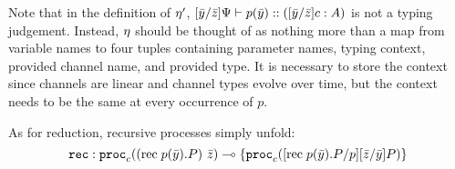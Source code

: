 \documentclass[a4paper,USenglish]{lipics-v2016}
\begin{document}

Note that in the definition of $\eta'$, $\lbrack{\bar{y}}/{\bar{z}}\rbrack{\Psi} \vdash {p}(\bar{y}) :: (\lbrack{\bar{y}}/{\bar{z}}\rbrack{c} : A)$ is not a typing judgement. Instead, $\eta$ should be thought of as nothing more than a map from variable names to four tuples containing parameter names, typing context, provided channel name, and provided type. It is necessary to store the context since channels are linear and channel types evolve over time, but the context needs to be the same at every occurrence of $p$.

As for reduction, recursive processes simply unfold:
$$ \texttt{rec} : \mathtt{proc}_{c}({(\mathrm{rec}\; {p}(\bar{y}) . {P})}~{\bar{z}})
     \multimap \lbrace \mathtt{proc}_{c}(\lbrack{\mathrm{rec}\; {p}(\bar{y}) . {P}}/{p}\rbrack{\lbrack{\bar{z}}/{\bar{y}}\rbrack{P}}) \rbrace
$$





\end{document}
